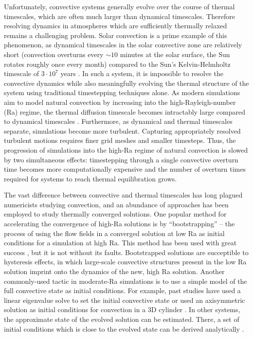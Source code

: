 \documentclass[aps, pre, onecolumn, nofootinbib, notitlepage, groupedaddress, amsfonts, amssymb, amsmath, longbibliography]{revtex4-1}
\begin{document}
Unfortunately, convective systems generally evolve over the course of thermal
timescales, which are often much larger than
dynamical timescales. Therefore resolving dynamics in atmospheres which are sufficiently
thermally relaxed remains a challenging problem.
Solar convection is a prime example of this phenomenon, as
dynamical timescales in the solar convective zone are relatively short 
(convection overturns every $\sim 10$ minutes at the solar surface, 
the Sun rotates roughly once every month)
compared to the Sun's Kelvin-Helmholtz timescale of
$3 \cdot 10^7$ years \cite{stix2003}.  
In such a system, it is impossible to resolve the convective dynamics while also
meaningfully evolving the thermal structure of the system using
traditional timestepping techniques alone.
As modern simulations aim to model natural convection
by increasing into the high-Rayleigh-number (Ra) regime,
the thermal diffusion timescale becomes intractably large
compared to dynamical timescales \cite{anders&brown2017}.
Furthermore, as dynamical and thermal timescales separate, 
simulations become more turbulent. Capturing appropriately resolved
turbulent motions requires finer grid meshes and smaller timesteps.
Thus, the progression of simulations into the high-Ra
regime of natural convection is slowed by two simultaneous effects: timestepping
through a single convective overturn time becomes more computationally expensive
and the number of overturn times required for systems to reach thermal equilibration
grows.

The vast difference between convective and thermal timescales has long plagued
numericists studying convection, and an abundance of approaches has been employed to
study thermally converged solutions. One popular method for accelerating the convergence
of high-Ra solutions is by ``bootstrapping'' -- the process of using the flow
fields in a converged solution at low Ra as initial conditions for a simulation at high
Ra.  This method has been used with great success \cite{johnston&doering2009, verzicco&camussi1997},
but it is not without its faults.  Bootstrapped solutions are succeptible to hysteresis
effects, in which large-scale convective structures present in the
low Ra solution imprint onto the dynamics of the new, high Ra solution. 
Another commonly-used tactic in
moderate-Ra simulations is to use 
a simple model of the full convective state as initial conditions.  
For example, past studies have used a linear eigenvalue solve to set the initial
convective state \cite{hurlburt&all1984} or used an axisymmetric solution 
as initial conditions for convection in a 3D cylinder \cite{verzicco&camussi1997}. 
In other systems, 
the approximate state of the evolved solution can be estimated. There, a
set of initial conditions which is close to the evolved state can be 
derived analytically \cite{couston&all2017, brandenburg&all2005}.
\end{document}

